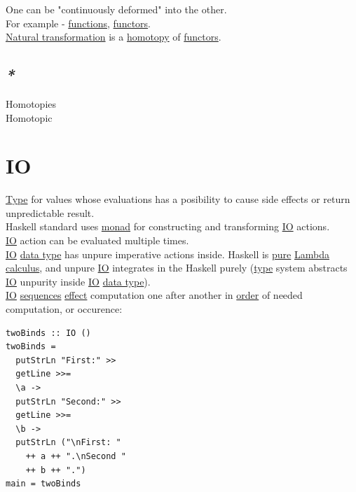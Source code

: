 \documentclass[a4paper,14pt,oneside]{book}
\begin{document}
One can be "continuously deformed" into the other.\\

For example - \hyperref[org788d18f]{functions}, \hyperref[org8f42943]{functors}.\\
\hyperref[org054d3e4]{Natural transformation} is a \hyperref[org098d327]{homotopy} of \hyperref[org8f42943]{functors}.\\

\section{\emph{*}}
\label{sec:org2a66cf9}

\label{org20d44fe}Homotopies\\
\label{org9dda839}Homotopic\\

\chapter{\label{orgb38a1fb}IO}
\label{sec:org221a2cf}
\hyperref[org35b9249]{Type} for values whose evaluations has a posibility to cause side effects or return unpredictable result.\\
Haskell standard uses \hyperref[org09c7087]{monad} for constructing and transforming \hyperref[orgb38a1fb]{IO} actions.\\
\hyperref[orgb38a1fb]{IO} action can be evaluated multiple times.\\

\hyperref[orgb38a1fb]{IO} \hyperref[org5fd92b4]{data type} has unpure imperative actions inside. Haskell is \hyperref[org16d9511]{pure} \hyperref[org1fa2ea8]{Lambda calculus}, and unpure \hyperref[orgb38a1fb]{IO} integrates in the Haskell purely (\hyperref[org35b9249]{type} system abstracts \hyperref[orgb38a1fb]{IO} unpurity inside \hyperref[orgb38a1fb]{IO} \hyperref[org5fd92b4]{data type}).\\

\hyperref[orgb38a1fb]{IO} \hyperref[org647b286]{sequences} \hyperref[orgfb5f966]{effect} computation one after another in \hyperref[orgd1a98a3]{order} of needed computation, or occurence:\\

\begin{verbatim}
twoBinds :: IO ()
twoBinds =
  putStrLn "First:" >>
  getLine >>=
  \a ->
  putStrLn "Second:" >>
  getLine >>=
  \b ->
  putStrLn ("\nFirst: "
    ++ a ++ ".\nSecond "
    ++ b ++ ".")
main = twoBinds
\end{verbatim}
\end{document}
